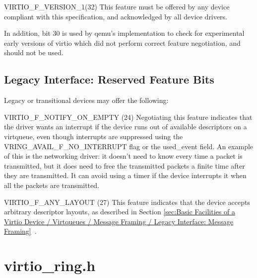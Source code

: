   VIRTIO_F_VERSION_1(32) This feature must be offered by any device
  compliant with this specification, and acknowledged by all device
  drivers.

In addition, bit 30 is used by qemu's implementation to check for experimental
early versions of virtio which did not perform correct feature negotiation,
and should not be used.

\section{Legacy Interface: Reserved Feature Bits}\label{sec:Reserved Feature Bits / Legacy Interface: Reserved Feature Bits}

Legacy or transitional devices may offer the following:

VIRTIO_F_NOTIFY_ON_EMPTY (24) Negotiating this feature
  indicates that the driver wants an interrupt if the device runs
  out of available descriptors on a virtqueue, even though
  interrupts are suppressed using the VRING_AVAIL_F_NO_INTERRUPT
  flag or the used_event field. An example of this is the
  networking driver: it doesn't need to know every time a packet
  is transmitted, but it does need to free the transmitted
  packets a finite time after they are transmitted. It can avoid
  using a timer if the device interrupts it when all the packets
  are transmitted.

VIRTIO_F_ANY_LAYOUT (27) This feature indicates that the device
  accepts arbitrary descriptor layouts, as described in Section
  \ref{sec:Basic Facilities of a Virtio Device / Virtqueues / Message Framing / Legacy Interface: Message Framing}~.

\chapter{virtio_ring.h}\label{sec:virtio-ring.h}


